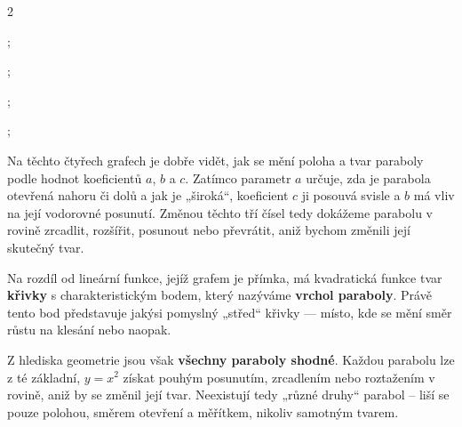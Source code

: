 \documentclass[12pt,a4paper]{article}
\begin{document}
\begin{center}
\begin{multicols}{2}
\begin{axisgraph}[
  xmin=-3, xmax=3,
  ymin=-5, ymax=2,
  samples=200,
  width=9cm, height=7cm,
  title={a) $y = -x^2$}
]
  ;
\end{axisgraph}

\begin{axisgraph}[
  xmin=-3, xmax=3,
  ymin=-2, ymax=5,
  samples=200,
  width=9cm, height=7cm,
  title={b) $y = 5x^2$}
]
  ;
\end{axisgraph}

\begin{axisgraph}[
  xmin=-3, xmax=3,
  ymin=-1, ymax=6,
  samples=200,
  width=9cm, height=7cm,
  title={c) $y = x^2 + 2$}
]
  ;
\end{axisgraph}

\begin{axisgraph}[
  xmin=-1, xmax=5,
  ymin=-1, ymax=9,
  samples=200,
  width=9cm, height=7cm,
  title={d) $y = x^2 - 4x + 8$}
]
  ;
\end{axisgraph}
\end{multicols}
\end{center}

Na těchto čtyřech grafech je dobře vidět, jak se mění poloha a tvar paraboly podle hodnot koeficientů \(a\), \(b\) a \(c\).  
Zatímco parametr \(a\) určuje, zda je parabola otevřená nahoru či dolů a jak je „široká“, koeficient \(c\) ji posouvá svisle a \(b\) má vliv na její vodorovné posunutí.  
Změnou těchto tří čísel tedy dokážeme parabolu v rovině zrcadlit, rozšířit, posunout nebo převrátit, aniž bychom změnili její skutečný tvar.

\medskip
Na rozdíl od lineární funkce, jejíž grafem je přímka, má kvadratická funkce tvar \textbf{křivky} s charakteristickým bodem, který nazýváme \textbf{vrchol paraboly}.  
Právě tento bod představuje jakýsi pomyslný „střed“ křivky — místo, kde se mění směr růstu na klesání nebo naopak.

\begin{notebox}
Z hlediska geometrie jsou však \textbf{všechny paraboly shodné}.  
Každou parabolu lze z té základní, $y=x^2$ získat pouhým posunutím, zrcadlením nebo roztažením v rovině, aniž by se změnil její tvar.  
Neexistují tedy „různé druhy“ parabol – liší se pouze polohou, směrem otevření a měřítkem, nikoliv samotným tvarem.
\end{notebox}
\end{document}

